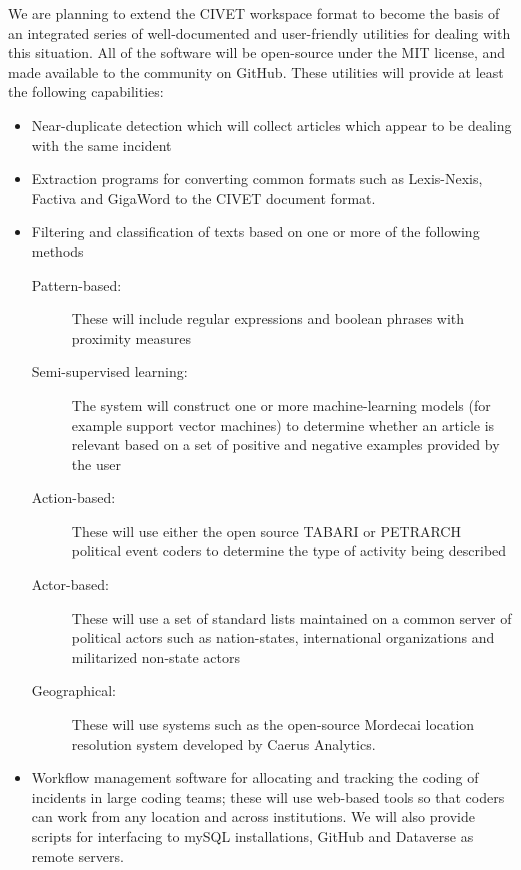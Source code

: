 \documentclass[letterpaper,10pt,english]{sphinxmanual}
\begin{document}
We are planning to extend the CIVET workspace format to become the basis
of an integrated series of well-documented and user-friendly utilities
for dealing with this situation. All of the software will be open-source
under the MIT license, and made available to the community on GitHub.
These utilities will provide at least the following capabilities:
\begin{itemize}
\item {} 
Near-duplicate detection which will collect articles which appear to
be dealing with the same incident

\item {} 
Extraction programs for converting common formats such as
Lexis-Nexis, Factiva and GigaWord to the CIVET document format.

\item {} 
Filtering and classification of texts based on one or more of the
following methods
\begin{description}
\item[{Pattern-based:}] \leavevmode
These will include regular expressions and boolean phrases with
proximity measures

\item[{Semi-supervised learning:}] \leavevmode
The system will construct one or more machine-learning models
(for example support vector machines) to determine whether an
article is relevant based on a set of positive and negative
examples provided by the user

\item[{Action-based:}] \leavevmode
These will use either the open source TABARI or PETRARCH
political event coders to determine the type of activity being
described

\item[{Actor-based:}] \leavevmode
These will use a set of standard lists maintained on a common
server of political actors such as nation-states, international
organizations and militarized non-state actors

\item[{Geographical:}] \leavevmode
These will use systems such as the open-source Mordecai location
resolution system developed by Caerus Analytics.

\end{description}

\item {} 
Workflow management software for allocating and tracking the coding
of incidents in large coding teams; these will use web-based tools so
that coders can work from any location and across institutions. We
will also provide scripts for interfacing to mySQL installations,
GitHub and Dataverse as remote servers.


\end{itemize}
\end{document}
